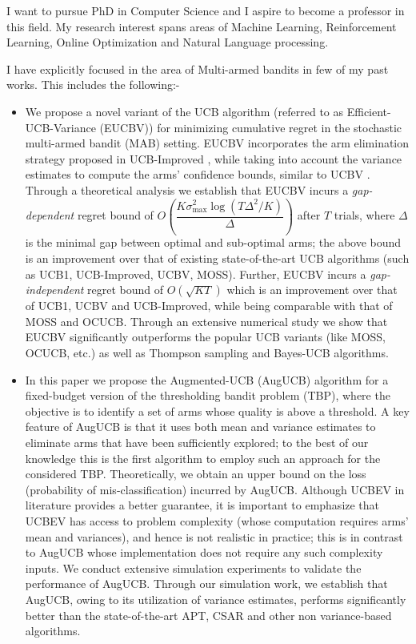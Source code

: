 \documentclass[margin,11pt]{res}
\begin{document}
I want to pursue PhD in Computer Science and I aspire to become a professor in this field. My research interest spans areas of Machine Learning, Reinforcement Learning, Online Optimization and Natural Language processing.

I have explicitly focused in the area of Multi-armed bandits in few of my past works. This includes the following:-

\begin{itemize}
\item We propose a novel variant of the UCB algorithm (referred to as Efficient-UCB-Variance (EUCBV)) for minimizing cumulative regret in the stochastic multi-armed bandit (MAB) setting. EUCBV incorporates the arm elimination strategy proposed in UCB-Improved \citep{auer2010ucb}, while taking into account the variance estimates to compute the arms' confidence bounds, similar to UCBV \citep{audibert2009exploration}. Through a theoretical analysis we establish that EUCBV incurs a \emph{gap-dependent} regret bound of  $O\left( \dfrac{K\sigma^2_{\max} \log (T\Delta^2 /K)}{\Delta}\right)$ after $T$ trials, where $\Delta$ is the minimal gap between optimal and sub-optimal arms; the above bound is an improvement over that of existing state-of-the-art UCB algorithms (such as UCB1, UCB-Improved, UCBV,  MOSS). Further, EUCBV incurs a \emph{gap-independent} regret bound of {\scriptsize $O\left(\sqrt{KT}\right)$}  which is an improvement over that of UCB1, UCBV and UCB-Improved, while being comparable with that of MOSS and OCUCB. Through an extensive numerical study we show that EUCBV significantly outperforms the popular UCB variants (like MOSS, OCUCB, etc.) as well as Thompson sampling and Bayes-UCB algorithms.

\item In this paper we propose the Augmented-UCB (AugUCB) algorithm for a fixed-budget version of the thresholding bandit problem (TBP), where the objective is to identify a set of arms whose quality is above a threshold. A key feature of AugUCB is that it uses both mean and variance estimates to eliminate arms that have been sufficiently explored; to the best of our knowledge this is the first algorithm to employ such an approach for the considered TBP.  Theoretically, we obtain an upper bound on the loss (probability of mis-classification) incurred by AugUCB. Although UCBEV in literature provides a better guarantee, it is important to emphasize that UCBEV has access to problem complexity (whose computation requires arms' mean and variances), and hence is not realistic in practice; this is in contrast to AugUCB whose implementation does not require any such complexity inputs. We conduct extensive simulation experiments to validate the performance of AugUCB. Through our simulation work, we establish that AugUCB, owing to its utilization of variance estimates, performs significantly better than the state-of-the-art APT, CSAR and other non variance-based algorithms.
\end{itemize}


\end{document}
